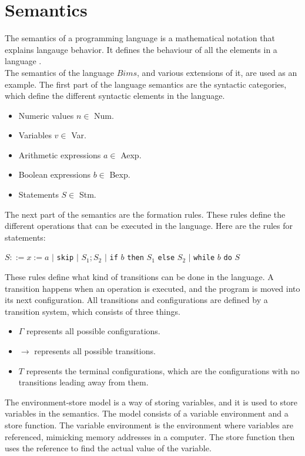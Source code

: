 \section{Semantics}
\label{sec:semantics}

The semantics of a programming language is a mathematical notation that explains langauge behavior. 
It defines the behaviour of all the elements in a language \cite{misc:sem}.\\ \indent
The semantics of the language $Bims$, and various extensions of it, are used as an example. 
The first part of the language semantics are the syntactic categories, which define the different syntactic elements in the language.

\begin{itemize}
\item Numeric values $n \in$ Num.
\item Variables $v \in$ Var.
\item Arithmetic expressions $a \in$ Aexp.
\item Boolean expressions $b \in$ Bexp.
\item Statements $S \in$ Stm.
\end{itemize}

The next part of the semantics are the formation rules. 
These rules define the different operations that can be executed in the language. 
Here are the rules for statements: \newline

$S ::= x := a$ $|$ \texttt{skip} $|$ $S_1;S_2$ $|$ \texttt{if} $b$ \texttt{then} $S_1$ \texttt{else} $S_2$ $|$ \texttt{while} $b$ \texttt{do} $S$\newline

These rules define what kind of transitions can be done in the language. 
A transition happens when an operation is executed, and the program is moved into its next configuration. 
All transitions and configurations are defined by a transition system, which consists of three things. 

\begin{itemize}
\item $\Gamma$ represents all possible configurations. 
\item $\rightarrow$ represents all possible transitions.
\item $T$ represents the terminal configurations, which are the configurations with no transitions leading away from them.
\end{itemize}

The environment-store model is a way of storing variables, and it is used to store variables in the semantics. \newline
The model consists of a variable environment and a store function. 
The variable environment is the environment where variables are referenced, mimicking memory addresses in a computer. 
The store function then uses the reference to find the actual value of the variable. \newline

